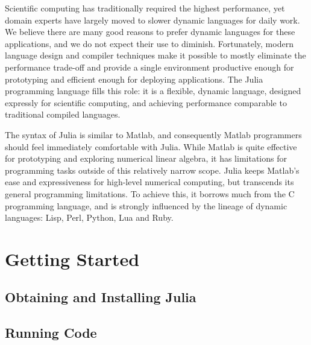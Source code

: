 \documentclass{article}
\title{\thetitle}
\author{
Jeff Bezanson \vspace{0.5em}\\
Stefan Karpinski \vspace{0.5em}\\
Viral Shah \vspace{0.5em}\\
Alan Edelman \vspace{0.5em}
}
\renewcommand{\sec}[1]{\label{sec:#1}}
\begin{document}
\maketitle

Scientific computing has traditionally required the highest performance, yet domain experts have largely moved to slower dynamic languages for daily work.
We believe there are many good reasons to prefer dynamic languages for these applications, and we do not expect their use to diminish.
Fortunately, modern language design and compiler techniques make it possible to mostly eliminate the performance trade-off and provide a single environment productive enough for prototyping and efficient enough for deploying applications.
The Julia programming language fills this role:
it is a flexible, dynamic language, designed expressly for scientific computing, and achieving performance comparable to traditional compiled languages.

The syntax of Julia is similar to Matlab, and consequently Matlab programmers should feel immediately comfortable with Julia.
While Matlab is quite effective for prototyping and exploring numerical linear algebra, it has limitations for programming tasks outside of this relatively narrow scope.
Julia keeps Matlab's ease and expressiveness for high-level numerical computing, but transcends its general programming limitations.
To achieve this, it borrows much from the C programming language, and is strongly influenced by the lineage of dynamic languages:
Lisp, Perl, Python, Lua and Ruby.

\section{Getting Started}\sec{getting-started}

\subsection{Obtaining and Installing Julia}\sec{obtaining-and-installing}

\subsection{Running Code}\sec{running-code}
\end{document}
